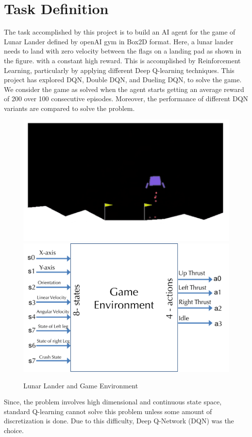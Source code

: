 \section{Task Definition}
\label{intro}

The task accomplished by this project is to build an AI agent for the game of Lunar Lander defined by openAI gym in Box2D format. Here, a lunar lander needs to land with zero velocity between the flags on a landing pad as shown in the figure. with a constant high reward. This is accomplished by Reinforcement Learning, particularly by applying different Deep Q-learning techniques. This project has explored  DQN\citep{journals/nature/MnihKSRVBGRFOPB15}, Double DQN\citep{DoubleQ-learning}, and Dueling DQN\citep{Dueling}, to solve the game. We consider the game as solved when the agent starts getting an average reward of 200 over 100 consecutive episodes. Moreover, the performance of different DQN variants are compared to solve the problem. \\


\begin{figure}[!ht]
\centering
\includegraphics[scale=0.50,width=0.50\columnwidth]{figures/game.png}%
\includegraphics[scale=0.50,width=0.50\columnwidth]{figures/game_env.png}%
\caption{ Lunar Lander and Game Environment }%
\label{fig:Visualization}%
\end{figure}

Since, the problem involves high dimensional and continuous state
space, standard Q-learning cannot solve this problem unless some amount of discretization is done. Due to this difficulty, Deep Q-Network (DQN) was the choice. 




